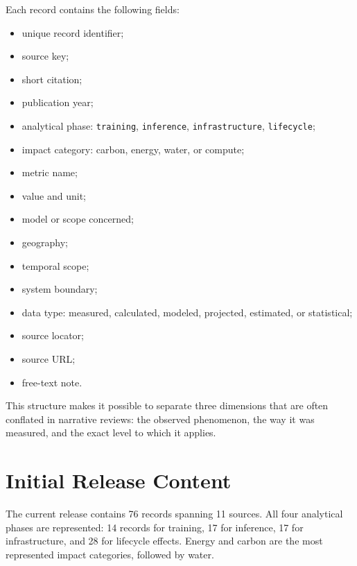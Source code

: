 \documentclass[11pt,a4paper]{article}
\begin{document}
Each record contains the following fields:
\begin{itemize}
\item unique record identifier;
\item source key;
\item short citation;
\item publication year;
\item analytical phase: \texttt{training}, \texttt{inference}, \texttt{infrastructure}, \texttt{lifecycle};
\item impact category: carbon, energy, water, or compute;
\item metric name;
\item value and unit;
\item model or scope concerned;
\item geography;
\item temporal scope;
\item system boundary;
\item data type: measured, calculated, modeled, projected, estimated, or statistical;
\item source locator;
\item source URL;
\item free-text note.
\end{itemize}

This structure makes it possible to separate three dimensions that are often conflated in narrative reviews: the observed phenomenon, the way it was measured, and the exact level to which it applies.

\section{Initial Release Content}
The current release contains 76 records spanning 11 sources. All four analytical phases are represented: 14 records for training, 17 for inference, 17 for infrastructure, and 28 for lifecycle effects. Energy and carbon are the most represented impact categories, followed by water.
\end{document}

